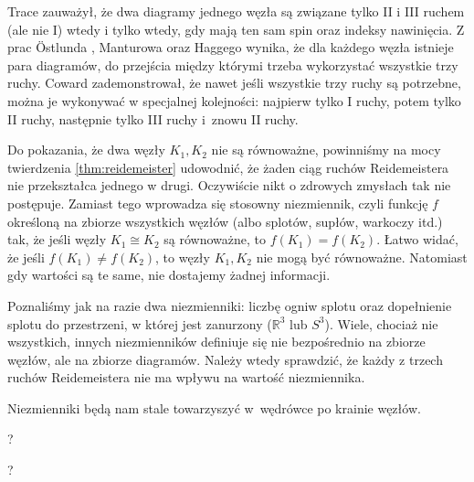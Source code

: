Trace \cite{trace1983} zauważył, że dwa diagramy jednego węzła są związane tylko II i III ruchem (ale nie I) wtedy i tylko wtedy, gdy mają ten sam spin oraz indeksy nawinięcia.
%
Z prac Östlunda \cite{ostlund2001}, Manturowa \cite[s. ???]{manturov2004} oraz Haggego \cite{hagge2006} wynika, że dla każdego węzła istnieje para diagramów, do przejścia między którymi trzeba wykorzystać wszystkie trzy ruchy.
%
%
%
Coward \cite{coward2006} zademonstrował, że nawet jeśli wszystkie trzy ruchy są potrzebne, można je wykonywać w specjalnej kolejności: najpierw tylko I ruchy, potem tylko II ruchy, następnie tylko III ruchy i~znowu II ruchy.
%

Do pokazania, że dwa węzły $K_1, K_2$ nie są równoważne, powinniśmy na mocy twierdzenia \ref{thm:reidemeister} udowodnić, że żaden ciąg ruchów Reidemeistera nie przekształca jednego w drugi.
Oczywiście nikt o zdrowych zmysłach tak nie postępuje.
Zamiast tego wprowadza się stosowny niezmiennik, czyli funkcję $f$ określoną na zbiorze wszystkich węzłów (albo splotów, supłów, warkoczy itd.) tak, że jeśli węzły $K_1 \cong K_2$ są równoważne, to $f(K_1) = f(K_2)$.
Łatwo widać, że jeśli $f(K_1) \neq f(K_2)$, to węzły $K_1, K_2$ nie mogą być równoważne.
Natomiast gdy wartości są te same, nie dostajemy żadnej informacji.

Poznaliśmy jak na razie dwa niezmienniki: liczbę ogniw splotu oraz dopełnienie splotu do przestrzeni, w której jest zanurzony ($\mathbb R^3$ lub $S^3$).
Wiele, chociaż nie wszystkich, innych niezmienników definiuje się nie bezpośrednio na zbiorze węzłów, ale na zbiorze diagramów.
Należy wtedy sprawdzić, że każdy z trzech ruchów Reidemeistera nie ma wpływu na wartość niezmiennika.

Niezmienniki będą nam stale towarzyszyć w~wędrówce po krainie węzłów.

\begin{remark}
    ?
\end{remark}

\begin{remark}
    ?
\end{remark}

